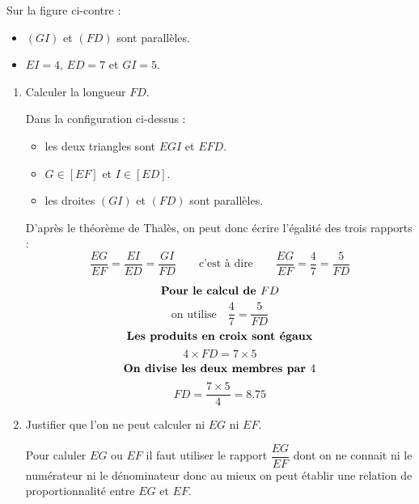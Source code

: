     \phantom{rrr}

    \begin{minipage}{0.6\linewidth}
        Sur la figure ci-contre :
        \begin{itemize}
            \item $(GI)$ et $(FD)$ sont parallèles.
            \item $EI=4$, $ED=7$ et $GI=5$.
        \end{itemize}
    \end{minipage}
    \begin{minipage}{0.3\linewidth}
    \end{minipage}
    \begin{multicols}{2}
        \begin{enumerate}
            \item Calculer la longueur $FD$.

            {\color{red}
            Dans la configuration ci-dessus :
            \begin{itemize}
                \item les deux triangles sont $EGI$ et $EFD$.
                \item $G \in [EF]$ et $I \in [ED]$.
                \item les droites $(GI)$ et $(FD)$ sont parallèles.
            \end{itemize}
            D'après le théorème de Thalès, on peut donc écrire l'égalité des trois rapports :
            $$\frac{EG}{EF}=\frac{EI}{ED}=\frac{GI}{FD}\qquad\mbox{c'est à dire}\qquad\frac{EG}{EF}=\frac{4}{7}=\frac{5}{FD}$$

                $$\mbox{\bf Pour le calcul de $FD$}$$
                $$\mbox{on utilise} \quad \dfrac{4}{7}=\dfrac{5}{FD}$$
                $$\mbox{\bf Les produits en croix sont égaux}$$
                $$4\times FD=7\times5$$
                $$\mbox{\bf On divise les deux membres par $4$}$$
                $$FD=\frac{7\times5}{4}=\num{8.75}$$
            }
            \columnbreak
            \item Justifier que l'on ne peut calculer ni $EG$ ni $EF$.

            {\color{red} Pour caluler $EG$ ou $EF$ il faut utiliser le rapport $\dfrac{EG}{EF}$ dont on ne connait ni le
            numérateur ni le dénominateur donc au mieux on peut établir une relation de proportionnalité entre $EG$ et $EF$.}
        \end{enumerate}
    \end{multicols}
